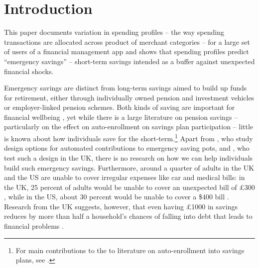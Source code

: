 
\section{Introduction}%
\label{sec:introduction}

This paper documents variation in spending profiles -- the way spending
transactions are allocated across product of merchant categories -- for a large
set of users of a financial management app and shows that spending profiles
predict ``emergency savings'' -- short-term savings intended as a buffer
against unexpected financial shocks.

Emergency savings are distinct from long-term savings aimed to build up funds
for retirement, either through individually owned pension and investment
vehicles or employer-linked pension schemes. Both kinds of saving are important
for financial wellbeing \citep{mps2018building, cfpb2017financial}, yet while
there is a large literature on pension savings -- particularly on the effect on
auto-enrollment on savings plan participation -- little is known about how
individuals save for the short-term.\footnote{For main contributions to the to
literature on auto-enrollment into savings plans, see \citet{madrian2001power,
choi2002defined, choi2004better, beshears2009importance}.} Apart from
\citet{beshears2020building}, who study design options for automated
contributions to emergency saving pots, and \citet{phillips2021supporting}, who
test such a design in the UK, there is no research on how we can help
individuals build such emergency savings. Furthermore, around a quarter of
adults in the UK and the US are unable to cover irregular expenses like car and
medical bills: in the UK, 25 percent of adults would be unable to cover an
unexpected bill of \pounds300 \citep{phillips2021supporting}, while in the US,
about 30 percent would be unable to cover a \$400 bill \citep{fed2022economic}.
Research from the UK suggests, however, that even having \pounds1000 in savings
reduces by more than half a household's chances of falling into debt that leads
to financial problems \citep{phillips2021supporting}.

